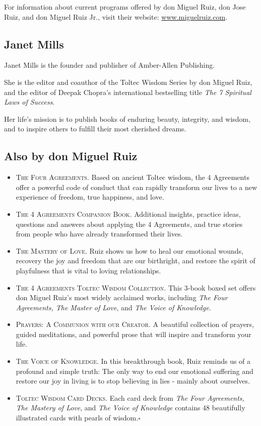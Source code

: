 \documentclass{article}
\numberwithin{equation}{section}
\begin{document}
%
For information about current programs offered by don Miguel Ruiz, don Jose Ruiz, and don Miguel Ruiz Jr., visit their website: \url{www.miguelruiz.com}.

\subsection{Janet Mills}
Janet Mills is the founder and publisher of Amber-Allen Publishing.

She is the editor and coauthor of the Toltec Wisdom Series by don Miguel Ruiz, and the editor of Deepak Chopra's international bestselling title \textit{The 7 Spiritual Laws of Success}.

Her life's mission is to publish books of enduring beauty, integrity, and wisdom, and to inspire others to fulfill their most cherished dreams.

\subsection{Also by don Miguel Ruiz}
\begin{itemize}
    \item \textsc{The Four Agreements.} Based on ancient Toltec wisdom, the 4 Agreements offer a powerful code of conduct that can rapidly transform our lives to a new experience of freedom, true happiness, and love.
    \item \textsc{The 4 Agreements Companion Book.} Additional insights, practice ideas, questions and answers about applying the 4 Agreements, and true stories from people who have already transformed their lives.
    \item \textsc{The Mastery of Love.} Ruiz shows us how to heal our emotional wounds, recovery the joy and freedom that are our birthright, and restore the spirit of playfulness that is vital to loving relationships.
    \item \textsc{The 4 Agreements Toltec Wisdom Collection.} This 3-book boxed set offers don Miguel Ruiz's most widely acclaimed works, including \textit{The Four Agreements, The Master of Love}, and \textit{The Voice of Knowledge}.
    \item \textsc{Prayers: A Communion with our Creator.} A beautiful collection of prayers, guided meditations, and powerful prose that will inspire and transform your life.
    \item \textsc{The Voice of Knowledge.} In this breakthrough book, Ruiz reminds us of a profound and simple truth: The only way to end our emotional suffering and restore our joy in living is to stop believing in lies - mainly about ourselves.
    \item \textsc{Toltec Wisdom Card Decks.} Each card deck from \textit{The Four Agreements, The Mastery of Love}, and \textit{The Voice of Knowledge} contains 48 beautifully illustrated cards with pearls of wisdom.\hfill$\square$
\end{itemize}


\printbibliography[heading=bibintoc]
\end{document}
